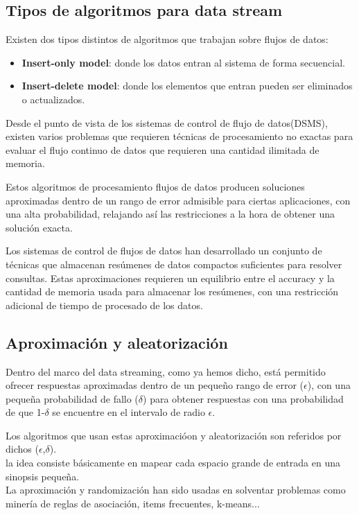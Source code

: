 \subsection{Tipos de algoritmos para data stream}

Existen dos tipos distintos de algoritmos que trabajan sobre flujos de datos:
\begin{itemize}
	\item \textbf{Insert-only model}: donde los datos entran al sistema de forma secuencial.
	\item \textbf{Insert-delete model}: donde los elementos que entran pueden ser eliminados o actualizados.
\end{itemize}

Desde el punto de vista de los sistemas de control de flujo de datos(DSMS), existen varios problemas que requieren técnicas de procesamiento no exactas para evaluar el flujo continuo de datos que requieren una cantidad ilimitada de memoria.

Estos algoritmos de procesamiento flujos de datos producen soluciones aproximadas dentro de un rango de error admisible para ciertas aplicaciones, con una alta probabilidad, relajando así las restricciones a la hora de obtener una solución exacta.

Los sistemas de control de flujos de datos han desarrollado un conjunto
de técnicas que almacenan resúmenes de datos compactos suficientes para resolver consultas. Estas aproximaciones requieren un equilibrio entre el accuracy y la cantidad de memoria usada para almacenar los resúmenes, con una restricción adicional de tiempo de procesado de los datos.


\subsection{Aproximación y aleatorización}

Dentro del marco del data streaming, como ya hemos dicho, está permitido ofrecer respuestas aproximadas dentro de un pequeño rango de error ($\epsilon$), con una pequeña probabilidad de fallo ($\delta$) para obtener respuestas con una probabilidad de que 1-$\delta$ se encuentre en el intervalo de radio $\epsilon$.

Los algoritmos que usan estas aproximacióon y aleatorización son referidos por dichos ($\epsilon$,$\delta$).\\
la idea consiste básicamente en mapear cada espacio grande de entrada en una sinopsis pequeña.\\
La aproximación y randomización han sido usadas en solventar problemas como minería de reglas de asociación, items frecuentes, k-means...


